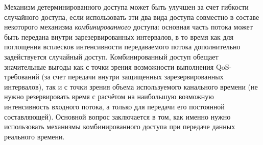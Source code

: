 Механизм детерминированного доступа может быть улучшен за счет гибкости случайного доступа,  если использовать эти два вида доступа совместно в составе некоторого механизма \textit{комбинированного} доступа: основная часть потока может быть передана внутри зарезервированных интервалов, в то время как для поглощения всплесков интенсивности передаваемого потока дополнительно задействуется случайный доступ. Комбинированный доступ обещает значительные выгоды как с точки зрения возможности выполнения QoS-требований (за счет передачи внутри защищенных зарезервированных интервалов), так и с точки зрения объема используемого канального времени (не нужно резервировать время с расчётом на наибольшую возможную интенсивность входного потока, а только для передачи его постоянной составляющей). Основной вопрос заключается в том, как именно нужно использовать механизмы комбинированного доступа при передаче данных реального времени.



